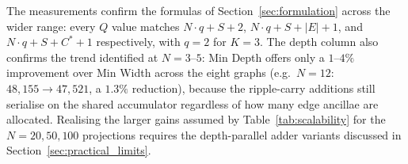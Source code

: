 \documentclass{ieeeaccess}
\begin{document}
\begin{table}[htbp]
\caption{Empirical Scaling for Random Moderate-Density Graphs ($K=3$, weights in $[1,10]$, 1 Grover iteration)}
\label{tab:scaling_measured}
\centering
{}
\end{table}

The measurements confirm the formulas of Section~\ref{sec:formulation} across the wider range: every $Q$ value matches $N \cdot q + S + 2$, $N \cdot q + S + |E| + 1$, and $N \cdot q + S + C^* + 1$ respectively, with $q = 2$ for $K = 3$. The depth column also confirms the trend identified at $N=3$--$5$: Min Depth offers only a $1$--$4\%$ improvement over Min Width across the eight graphs (e.g.\ $N{=}12$: $48{,}155 \to 47{,}521$, a $1.3\%$ reduction), because the ripple-carry additions still serialise on the shared accumulator regardless of how many edge ancillae are allocated. Realising the larger gains assumed by Table~\ref{tab:scalability} for the $N=20, 50, 100$ projections requires the depth-parallel adder variants discussed in Section~\ref{sec:practical_limits}.
\end{document}
